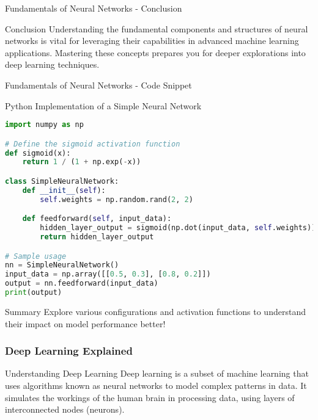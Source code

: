 \documentclass[aspectratio=169]{beamer}
\begin{document}
\begin{frame}[fragile]{Fundamentals of Neural Networks - Conclusion}
    \begin{block}{Conclusion}
        Understanding the fundamental components and structures of neural networks is vital for leveraging their capabilities in advanced machine learning applications. Mastering these concepts prepares you for deeper explorations into deep learning techniques.
    \end{block}
\end{frame}

\begin{frame}[fragile]{Fundamentals of Neural Networks - Code Snippet}
    \begin{block}{Python Implementation of a Simple Neural Network}
        \begin{lstlisting}[language=Python]
import numpy as np

# Define the sigmoid activation function
def sigmoid(x):
    return 1 / (1 + np.exp(-x))

class SimpleNeuralNetwork:
    def __init__(self):
        self.weights = np.random.rand(2, 2) 

    def feedforward(self, input_data):
        hidden_layer_output = sigmoid(np.dot(input_data, self.weights))
        return hidden_layer_output

# Sample usage
nn = SimpleNeuralNetwork()
input_data = np.array([[0.5, 0.3], [0.8, 0.2]])
output = nn.feedforward(input_data)
print(output)
        \end{lstlisting}
    \end{block}

    \begin{block}{Summary}
        Explore various configurations and activation functions to understand their impact on model performance better!
    \end{block}
\end{frame}

\begin{frame}[fragile]
    \frametitle{Deep Learning Explained}
    \begin{block}{Understanding Deep Learning}
        Deep learning is a subset of machine learning that uses algorithms known as neural networks to model complex patterns in data. It simulates the workings of the human brain in processing data, using layers of interconnected nodes (neurons).
    \end{block}
\end{frame}
\end{document}
